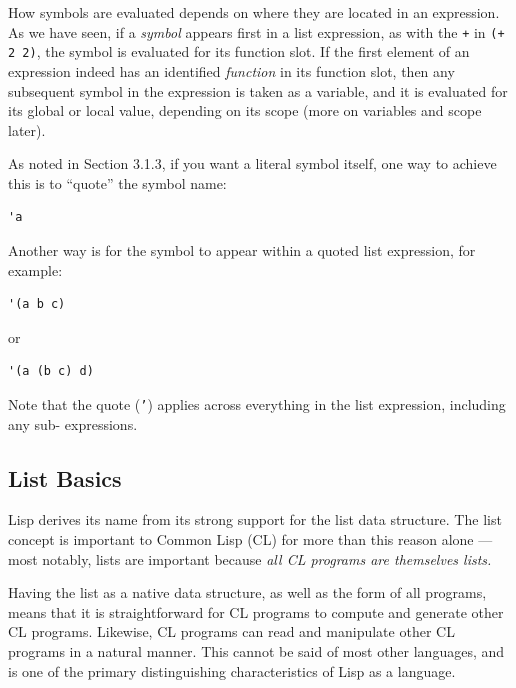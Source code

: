 \documentclass [11pt]{book}
\begin{document}
How symbols are evaluated depends on where they are
located in an expression. As we have seen, if a \emph{symbol} appears first in a list expression, as with the \texttt{+} in \texttt{(+ 2 2)}, the symbol is evaluated for its function slot. If the
first element of an expression indeed has an identified \emph{function} in its function slot, then any 
subsequent symbol in the expression is taken as a variable, and it is evaluated 
for its global or local value, depending on its scope (more on variables and 
scope later).



As noted in Section 3.1.3, if you want a literal symbol itself, one
way to achieve this is to ``quote'' the symbol name:

\begin{verbatim}'a
\end{verbatim}



Another way is for the symbol to appear within a quoted list expression, for example:

\begin{verbatim}'(a b c)
\end{verbatim} or 

\begin{verbatim}'(a (b c) d)
\end{verbatim}



Note that the quote (\texttt{'}) applies across everything in the list expression, including any sub- expressions.



\subsection{List Basics}

\label{subsec:listbasics}



Lisp derives its name from its strong support for the
list data structure. The list concept is important to Common Lisp (CL)
for more than this reason alone --- most notably, lists are important
because \emph{all CL programs are themselves lists.}



 Having the list as a native data structure, as well as the form of all
programs, means that it is straightforward for CL programs to compute
and generate other CL programs. Likewise, CL programs can read and
manipulate other CL programs in a natural manner. This cannot be said
of most other languages, and is one of the primary distinguishing
characteristics of Lisp as a language.
\end{document}
